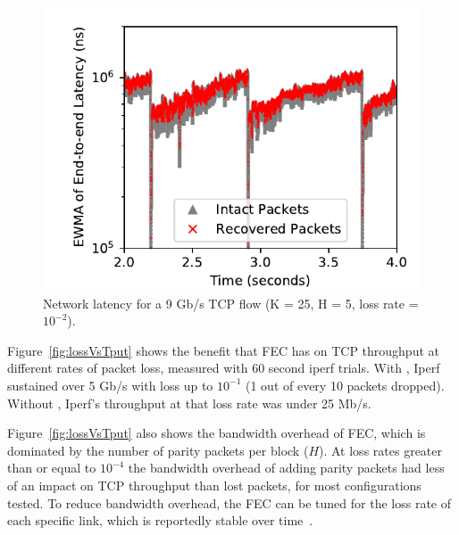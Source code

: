 \begin{figure}
  \centering
  \includegraphics[width=0.3\paperwidth]{figures/tcpLatency.pdf}
  \caption{\label{fig:lossVsLatencyTcp} Network latency for a 9 Gb/s TCP flow (K = 25, H = 5, loss rate = $10 ^{-2}$).}
\end{figure}

Figure~\ref{fig:lossVsTput} shows the benefit that FEC has on TCP throughput
at different rates of packet loss, measured with 60 second iperf trials. With
\OurSys, Iperf sustained  over 5 Gb/s with loss up to $10^{-1}$ (1 out of
every 10 packets dropped). Without \OurSys, Iperf's throughput at that loss
rate was under 25 Mb/s.


Figure~\ref{fig:lossVsTput} also shows the bandwidth overhead of  FEC, which
is dominated by the number of parity packets per block ($H$).  At loss rates
greater than or equal to $10^{-4}$ the bandwidth overhead of adding  parity
packets had less of an impact on TCP throughput than lost packets, for  most
configurations tested. To reduce bandwidth overhead, the FEC  can be tuned for the
loss rate of each specific link, which is reportedly stable over
time~\cite{corropt}.



